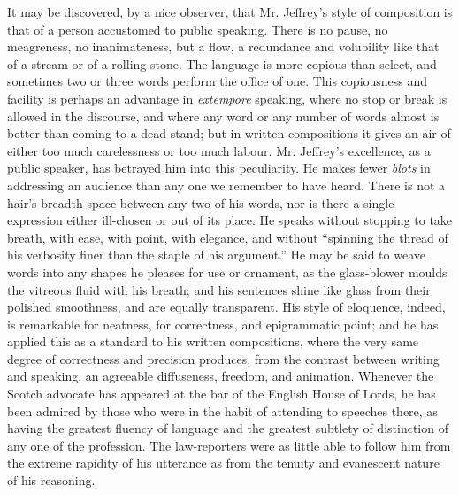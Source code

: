 It may be discovered, by a nice observer, that Mr. Jeffrey's style
of composition is that of a person accustomed to public
speaking. There is no pause, no meagreness, no inanimateness, but
a flow, a redundance and volubility like that of a stream or of a
rolling-stone. The language is more copious than select, and
sometimes two or three words perform the office of one. This
copiousness and facility is perhaps an advantage in
\emph{extempore} speaking, where no stop or break is allowed in
the discourse, and where any word or any number of words almost is
better than coming to a dead stand; but in written compositions it
gives an air of either too much carelessness or too much
labour. Mr. Jeffrey's excellence, as a public speaker, has
betrayed him into this peculiarity.  He makes fewer \emph{blots}
in addressing an audience than any one we remember to have
heard. There is not a hair's-breadth space between any two of his
words, nor is there a single expression either ill-chosen or out
of its place. He speaks without stopping to take breath, with
ease, with point, with elegance, and without ``spinning the thread
of his verbosity finer than the staple of his argument.'' He may
be said to weave words into any shapes he pleases for use or
ornament, as the glass-blower moulds the vitreous fluid with his
breath; and his sentences shine like glass from their polished
smoothness, and are equally transparent. His style of eloquence,
indeed, is remarkable for neatness, for correctness, and
epigrammatic point; and he has applied this as a standard to his
written compositions, where the very same degree of correctness
and precision produces, from the contrast between writing and
speaking, an agreeable diffuseness, freedom, and animation.
Whenever the Scotch advocate has appeared at the bar of the
English House of Lords, he has been admired by those who were in
the habit of attending to speeches there, as having the greatest
fluency of language and the greatest subtlety of distinction of
any one of the profession.  The law-reporters were as little able
to follow him from the extreme rapidity of his utterance as from
the tenuity and evanescent nature of his reasoning.

